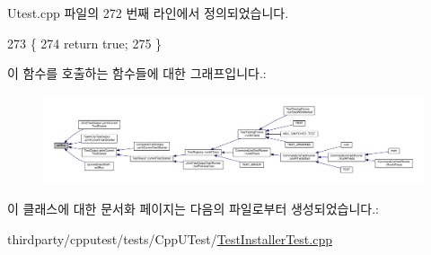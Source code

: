 Utest.\+cpp 파일의 272 번째 라인에서 정의되었습니다.


\begin{DoxyCode}
273 \{
274     \textcolor{keywordflow}{return} \textcolor{keyword}{true};
275 \}
\end{DoxyCode}


이 함수를 호출하는 함수들에 대한 그래프입니다.\+:
\nopagebreak
\begin{figure}[H]
\begin{center}
\leavevmode
\includegraphics[width=350pt]{class_utest_shell_afa35d9bf0fd1c772b04f48d89d318a70_icgraph}
\end{center}
\end{figure}




이 클래스에 대한 문서화 페이지는 다음의 파일로부터 생성되었습니다.\+:\begin{DoxyCompactItemize}
\item 
thirdparty/cpputest/tests/\+Cpp\+U\+Test/\hyperlink{_test_installer_test_8cpp}{Test\+Installer\+Test.\+cpp}\end{DoxyCompactItemize}
